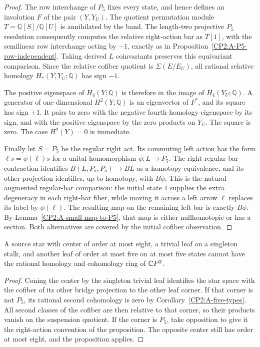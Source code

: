 \begin{proof}
The row interchange of $P_5$ fixes every state, and hence
defines an involution $F$ of the pair $(Y,Y_U)$.
The quotient permutation module
$T=\mathbb Q[S]/\mathbb Q[U]$ is annihilated by the band.
The length-two projective $P_5$ resolution consequently
computes the relative right-action bar as $T[1]$, with
the semilinear row interchange acting by $-1$, exactly as
in Proposition~\ref{CP2:A-P5-row-independent}. Taking
derived $L$ coinvariants preserves this equivariant
comparison. Since the relative cofiber quotient is
$\Sigma(E/E_U)$, all rational relative homology
$H_*(Y,Y_U;\mathbb Q)$ has sign $-1$.

The positive eigenspace of $H_4(Y;\mathbb Q)$ is therefore
in the image of $H_4(Y_U;\mathbb Q)$. A generator of
one-dimensional $H^2(Y;\mathbb Q)$ is an eigenvector of
$F^*$, and its square has sign $+1$. It pairs to zero with
the negative fourth-homology eigenspace by its sign, and
with the positive eigenspace by the zero products on
$Y_U$. The square is zero. The case $H^2(Y)=0$ is immediate.

Finally let $S=P_5$ be the regular right act. Its commuting
left action has the form $\ell s=\phi(\ell)s$ for a
unital homomorphism $\phi:L\to P_5$. The right-regular
bar contraction identifies
$B(L,P_5,P_5)\to BL$ as a homotopy equivalence, and its
other projection identifies, up to homotopy, with $B\phi$.
This is the natural augmented regular-bar comparison: the
initial state $1$ supplies the extra degeneracy in each
right-bar fiber, while moving it across a left arrow
$\ell$ replaces its label by $\phi(\ell)$. The resulting
map on the remaining left bar is exactly $B\phi$.
By Lemma~\ref{CP2:A-small-map-to-P5}, that map is either
nullhomotopic or has a section. Both alternatives are
covered by the initial cofiber observation.
\end{proof}

\begin{corollary}
\label{CP2:A-star-coned-five-leaf}
A source star with center of order at most eight, a
trivial leaf on a singleton stalk, and another leaf of
order at most five on at most five states cannot have the
rational homology and cohomology ring of $\mathbb{C}P^2$.
\end{corollary}
\begin{proof}
Coning the center by the singleton trivial leaf identifies
the star space with the cofiber of its other bridge
projection to the other leaf corner. If that corner is
not $P_5$, its rational second cohomology is zero by
Corollary~\ref{CP2:A-five-types}. All second classes of
the cofiber are then relative to that corner, so their
products vanish on the suspension quotient. If the corner
is $P_5$, take opposition to give it the right-action
convention of the proposition. The opposite center still
has order at most eight, and the proposition applies.
\end{proof}
